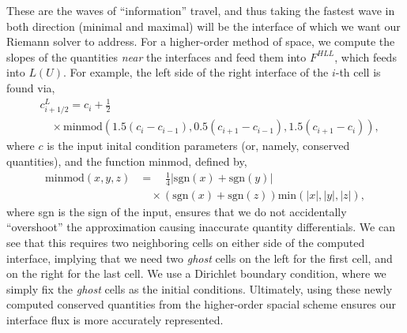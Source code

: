 \documentclass[iop,twocolumn]{emulateapj}
\begin{document}
These are the waves of ``information'' travel, and thus taking the fastest wave in both direction (minimal and maximal) will be the interface of which we want our Riemann solver to address.
For a higher-order method of space, we compute the slopes of the quantities {\it near} the interfaces and feed them into $F^{HLL}$, which feeds into $L(U)$. For example,  the left side of the right interface of the $i$-th cell is found via,
\begin{align*}
  &c^L_{i+1/2}= c_i +\frac{1}{2} \\
  &\quad\times\textrm{minmod}\left(1.5(c_i-c_{i-1}),0.5(c_{i+1}-c_{i-1}),1.5(c_{i+1}-c_i)\right),
\end{align*}
where $c$ is the input inital condition parameters (or, namely, conserved quantities), and the function minmod, defined by,
\begin{align*}
  \textrm{minmod}(x,y,z)&=\quad\frac{1}{4}|\textrm{sgn}(x)+\textrm{sgn}(y)|\\
  &\quad\times(\textrm{sgn}(x)+\textrm{sgn}(z))\textrm{min}(|x|,|y|,|z|),
\end{align*}
where sgn is the sign of the input, ensures that we do not accidentally ``overshoot'' the approximation causing inaccurate quantity differentials. We can see that this requires two neighboring cells on either side of the computed interface, implying that we need two {\it ghost} cells on the left for the first cell, and on the right for the last cell. We use a Dirichlet boundary condition, where we simply fix the {\it ghost} cells as the initial conditions. Ultimately, using these newly computed conserved quantities from the higher-order spacial scheme ensures our interface flux is more accurately represented.
\end{document}
